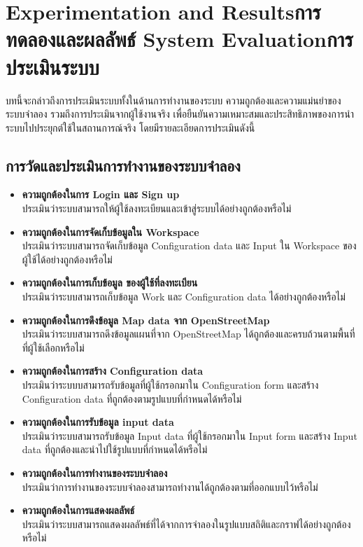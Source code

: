 \chapter{\ifproject%
\ifenglish Experimentation and Results\else การทดลองและผลลัพธ์\fi
\else%
\ifenglish System Evaluation\else การประเมินระบบ\fi
\fi}
\begin{mypara}
    \indent บทนี้จะกล่าวถึงการประเมินระบบทั้งในด้านการทำงานของระบบ ความถูกต้องและความแม่นยำของระบบจำลอง 
    รวมถึงการประเมินจากผู้ใช้งานจริง เพื่อยืนยันความเหมาะสมและประสิทธิภาพของการนำระบบไปประยุกต์ใช้ในสถานการณ์จริง
    โดยมีรายละเอียดการประเมินดังนี้
\end{mypara}

\section{การวัดและประเมินการทำงานของระบบจำลอง}
\begin{itemize}
    \item \textbf{ความถูกต้องในการ Login และ Sign up}
        \\ ประเมินว่าระบบสามารถให้ผู้ใช้ลงทะเบียนและเข้าสู่ระบบได้อย่างถูกต้องหรือไม่
    \item \textbf{ความถูกต้องในการจัดเก็บข้อมูลใน Workspace}
        \\ ประเมินว่าระบบสามารถจัดเก็บข้อมูล Configuration data และ Input ใน Workspace ของผู้ใช้ได้อย่างถูกต้องหรือไม่
    \item \textbf{ความถูกต้องในการเก็บข้อมูล ของผู้ใช้ที่ลงทะเบียน}
        \\ ประเมินว่าระบบสามารถเก็บข้อมูล Work และ Configuration data ได้อย่างถูกต้องหรือไม่
    \item \textbf{ความถูกต้องในการดึงข้อมูล Map data จาก OpenStreetMap}
        \\ ประเมินว่าระบบสามารถดึงข้อมูลแผนที่จาก OpenStreetMap ได้ถูกต้องและครบถ้วนตามพื้นที่ที่ผู้ใช้เลือกหรือไม่
    \item \textbf{ความถูกต้องในการสร้าง Configuration data}
        \\ ประเมินว่าระบบบสามารถรับข้อมูลที่ผู้ใช้กรอกมาใน Configuration form และสร้าง Configuration data ที่ถูกต้องตามรูปแบบที่กำหนดได้หรือไม่
    \item \textbf{ความถูกต้องในการรับข้อมูล input data}
        \\ ประเมินว่าระบบสามารถรับข้อมูล Input data ที่ผู้ใช้กรอกมาใน Input form และสร้าง Input data ที่ถูกต้องและนำไปใช้รูปแบบที่กำหนดได้หรือไม่
    \item \textbf{ความถูกต้องในการทำงานของระบบจำลอง}
        \\ ประเมินว่าการทำงานของระบบจำลองสามารถทำงานได้ถูกต้องตามที่ออกแบบไว้หรือไม่
    \item \textbf{ความถูกต้องในการแสดงผลลัพธ์}
        \\ ประเมินว่าระบบสามารถแสดงผลลัพธ์ที่ได้จากการจำลองในรูปแบบสถิติและกราฟได้อย่างถูกต้องหรือไม่

\end{itemize}
